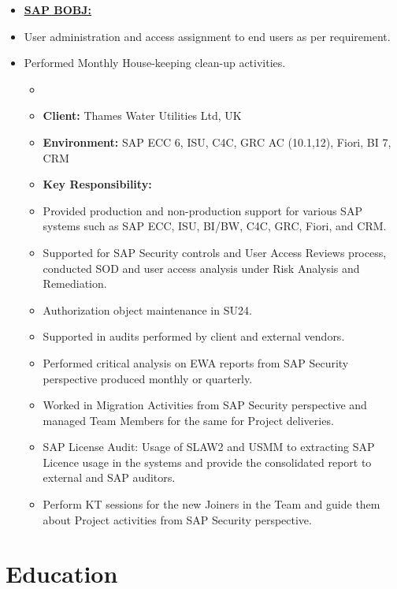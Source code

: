 \documentclass[10pt]{article}
\begin{document}
	\begin{itemize}
		\small
     		\item[] \textbf{\underline{SAP BOBJ:}} 
        		\item User administration and access assignment to end users as per requirement.
				\item Performed Monthly House-keeping clean-up activities.
	
		\begin{itemize}
		\item[]  
			\item[\ding{226}] \textbf {Client:} Thames Water Utilities Ltd, UK
			\item[] \textbf {Environment: } SAP ECC 6, ISU, C4C, GRC AC (10.1,12), Fiori, BI 7, CRM
		\end{itemize}
		
		\begin{itemize}
			\item[] \textbf {Key Responsibility:}
				\item Provided production and non-production support for various SAP systems such as SAP ECC, ISU, BI/BW, C4C, GRC, Fiori, and CRM.
				\item Supported for SAP Security controls and User Access Reviews process, conducted SOD and user access analysis under Risk Analysis and Remediation.
				\item Authorization object maintenance in SU24.
				\item Supported in audits performed by client and external vendors.
				\item Performed critical analysis on EWA reports from SAP Security perspective produced monthly or quarterly.
				\item Worked in Migration Activities from SAP Security perspective and managed Team Members for the same for Project deliveries.
				\item SAP License Audit: Usage of SLAW2 and USMM to extracting SAP Licence usage in the systems and provide the consolidated report to external and SAP auditors.
				\item Perform KT sessions for the new Joiners in the Team and guide them about Project activities from SAP Security perspective.
		\end{itemize}
	\end{itemize}

\section{Education}
\end{document}
